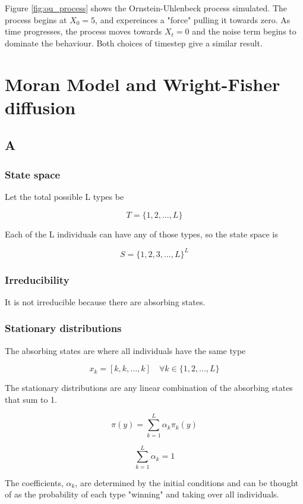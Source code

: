 \documentclass{article}
\begin{document}
Figure \ref{fig:ou_process} shows the Ornstein-Uhlenbeck process simulated. The process begins at $X_0=5$, and expereinces a "force" pulling it towards zero. As time progresses, the process moves towards $X_t=0$ and the noise term begins to dominate the behaviour. Both choices of timestep give a similar result.

\section{Moran Model and Wright-Fisher diffusion}

\subsection{A}

\subsubsection{State space}

Let the total possible L types be 

$$T = \{1,2,...,L\}$$

Each of the L individuals can have any of those types, so the state space is 

$$S = \{1,2,3,...,L\}^L$$

\subsubsection{Irreducibility}

It is not irreducible because there are absorbing states. 

\subsubsection{Stationary distributions}

The absorbing states are where all individuals have the same type

$$x_k = [k,k,...,k] \quad \forall k \in \{1,2,...,L\}  $$

The stationary distributions are any linear combination of the absorbing states that sum to 1. 

$$\pi(y) = \sum_{k=1}^L \alpha_k \pi_k(y)$$

$$\sum_{k=1}^L \alpha_k = 1$$

The coefficients, $\alpha_k$, are determined by the initial conditions and can be thought of as the probability of each type "winning" and taking over all individuals. 
\end{document}
